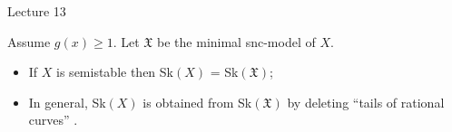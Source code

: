 \begin{section}{Lecture 13}
\begin{theorem} Assume $g(x) \geq 1$. Let $\mathfrak{X}$ be the  minimal snc-model of $X$. 
\begin{itemize}
 \item If $X$ is semistable then Sk$(X)$ = Sk$(\mathfrak{X})$;
 \item In general, Sk$(X)$ is obtained from Sk$(\mathfrak{X})$ by deleting ``tails of rational curves'' .
\end{itemize}
 \end{theorem}
\end{section}
